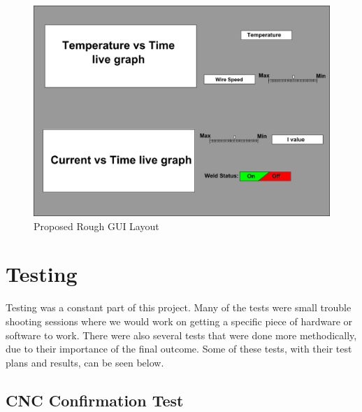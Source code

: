 \documentclass[12pt]{article}
\newlength\tindent
\renewcommand{\indent}{\hspace*{\tindent}}
\begin{document}
\begin{figure}[h]
\centering
\includegraphics[scale=0.5]{gui}
\caption{Proposed Rough GUI Layout}
\end{figure}

\clearpage

\section{Testing}
\indent Testing was a constant part of this project. Many of the tests were small trouble shooting sessions where we would work on getting a specific piece of hardware or software to work. There were also several tests that were done more methodically, due to their importance of the final outcome. Some of these tests, with their test plans and results, can be seen below.

\subsection{CNC Confirmation Test}
\end{document}
